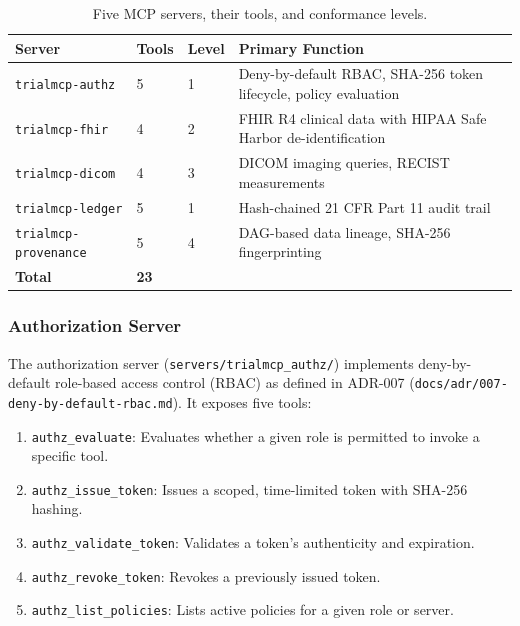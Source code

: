 \documentclass{article}
\begin{document}
\begin{table}[H]
\centering
\caption{Five MCP servers, their tools, and conformance levels.}
\label{tab:five-servers}
\footnotesize
\begin{tabularx}{\textwidth}{@{}L{3.2cm}C{0.8cm}C{1.0cm}L{6.8cm}@{}}
\toprule
\textbf{Server} & \textbf{Tools} & \textbf{Level} & \textbf{Primary Function} \\
\midrule
\texttt{trialmcp-authz} & 5 & 1 & Deny-by-default RBAC, SHA-256 token lifecycle, policy evaluation \\
\texttt{trialmcp-fhir} & 4 & 2 & FHIR R4 clinical data with HIPAA Safe Harbor de-identification \\
\texttt{trialmcp-dicom} & 4 & 3 & DICOM imaging queries, RECIST~\cite{eisenhauer2009recist} measurements \\
\texttt{trialmcp-ledger} & 5 & 1 & Hash-chained 21 CFR Part 11 audit trail \\
\texttt{trialmcp-provenance} & 5 & 4 & DAG-based data lineage, SHA-256 fingerprinting \\
\midrule
\textbf{Total} & \textbf{23} & & \\
\bottomrule
\end{tabularx}
\end{table}

\subsubsection{Authorization Server}

The authorization server (\texttt{servers/trialmcp\_authz/}) implements deny-by-default role-based access control (RBAC) as defined in ADR-007 (\texttt{docs/adr/007-deny-by-default-rbac.md}). It exposes five tools:

\begin{enumerate}[leftmargin=*]
\item \texttt{authz\_evaluate}: Evaluates whether a given role is permitted to invoke a specific tool.
\item \texttt{authz\_issue\_token}: Issues a scoped, time-limited token with SHA-256 hashing.
\item \texttt{authz\_validate\_token}: Validates a token's authenticity and expiration.
\item \texttt{authz\_revoke\_token}: Revokes a previously issued token.
\item \texttt{authz\_list\_policies}: Lists active policies for a given role or server.
\end{enumerate}
\end{document}
